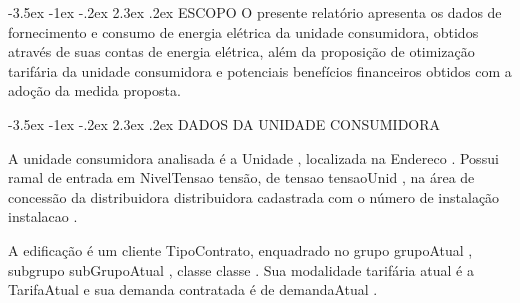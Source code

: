 \documentclass[a4paper,12pt]{abntex2}
\makeatletter
\renewcommand\chapter{\@startsection{chapter}{0}{\z@}%
  {-3.5ex \@plus -1ex \@minus -.2ex}%
  {2.3ex \@plus.2ex}%
  {\normalfont\Large\bfseries}}
\renewcommand{\arraystretch}{1.3}
\makeatother
\begin{document}
    \begin{table}[!ht]
        \centering
        \setlength{\tabcolsep}{5pt}
        \renewcommand{\arraystretch}{1.3}
    \end{table} 
    \vfill
    
    \newpage

\chapter{ESCOPO}
O presente relatório apresenta os dados de fornecimento e consumo de energia elétrica da unidade consumidora, obtidos através de suas contas de energia elétrica, além da proposição de otimização tarifária da unidade consumidora e potenciais benefícios financeiros obtidos com a adoção da medida proposta.

\chapter{DADOS DA UNIDADE CONSUMIDORA}

A unidade consumidora analisada é a {{ Unidade }}, localizada na {{ Endereco }}. Possui ramal de entrada em {{ NivelTensao }} tensão, de {{ tensao }} {{ tensaoUnid }}, na área de concessão da distribuidora {{ distribuidora }} cadastrada com o número de instalação {{ instalacao }}.

A edificação  é  um  cliente  {{TipoContrato}}, enquadrado no grupo {{ grupoAtual }}, subgrupo {{ subGrupoAtual }}, classe {{ classe }}. Sua modalidade tarifária atual é a {{ TarifaAtual }} e sua demanda contratada é de {{ demandaAtual }}.
\end{document}
